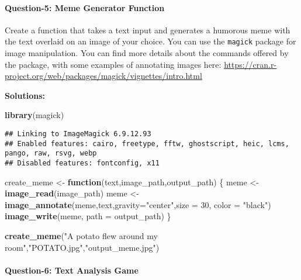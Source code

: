 \documentclass[
]{article}
\newenvironment{Shaded}{\begin{snugshade}}{\end{snugshade}}
\newcommand{\AttributeTok}[1]{\textcolor[rgb]{0.13,0.29,0.53}{#1}}
\newcommand{\ControlFlowTok}[1]{\textcolor[rgb]{0.13,0.29,0.53}{\textbf{#1}}}
\newcommand{\DecValTok}[1]{\textcolor[rgb]{0.00,0.00,0.81}{#1}}
\newcommand{\FunctionTok}[1]{\textcolor[rgb]{0.13,0.29,0.53}{\textbf{#1}}}
\newcommand{\NormalTok}[1]{#1}
\newcommand{\OtherTok}[1]{\textcolor[rgb]{0.56,0.35,0.01}{#1}}
\newcommand{\StringTok}[1]{\textcolor[rgb]{0.31,0.60,0.02}{#1}}
\begin{document}
\hypertarget{question-5-meme-generator-function}{%
\paragraph{Question-5: Meme Generator
Function}\label{question-5-meme-generator-function}}

Create a function that takes a text input and generates a humorous meme
with the text overlaid on an image of your choice. You can use the
\texttt{magick} package for image manipulation. You can find more
details about the commands offered by the package, with some examples of
annotating images here:
\url{https://cran.r-project.org/web/packages/magick/vignettes/intro.html}

\textbf{Solutions:}

\begin{Shaded}
\begin{Highlighting}[]
\FunctionTok{library}\NormalTok{(magick)}
\end{Highlighting}
\end{Shaded}

\begin{verbatim}
## Linking to ImageMagick 6.9.12.93
## Enabled features: cairo, freetype, fftw, ghostscript, heic, lcms, pango, raw, rsvg, webp
## Disabled features: fontconfig, x11
\end{verbatim}

\begin{Shaded}
\begin{Highlighting}[]
\NormalTok{create\_meme }\OtherTok{\textless{}{-}} \ControlFlowTok{function}\NormalTok{(text,image\_path,output\_path) \{}
\NormalTok{  meme }\OtherTok{\textless{}{-}} \FunctionTok{image\_read}\NormalTok{(image\_path)}
\NormalTok{  meme }\OtherTok{\textless{}{-}} \FunctionTok{image\_annotate}\NormalTok{(meme,text,}\AttributeTok{gravity=}\StringTok{"center"}\NormalTok{,}\AttributeTok{size =} \DecValTok{30}\NormalTok{, }\AttributeTok{color =} \StringTok{"black"}\NormalTok{)}
  \FunctionTok{image\_write}\NormalTok{(meme, }\AttributeTok{path =}\NormalTok{ output\_path)}
\NormalTok{\}}

\FunctionTok{create\_meme}\NormalTok{(}\StringTok{"A potato flew around my room"}\NormalTok{,}\StringTok{"POTATO.jpg"}\NormalTok{,}\StringTok{"output\_meme.jpg"}\NormalTok{)}
\end{Highlighting}
\end{Shaded}

\hypertarget{question-6-text-analysis-game}{%
\paragraph{Question-6: Text Analysis
Game}\label{question-6-text-analysis-game}}
\end{document}

